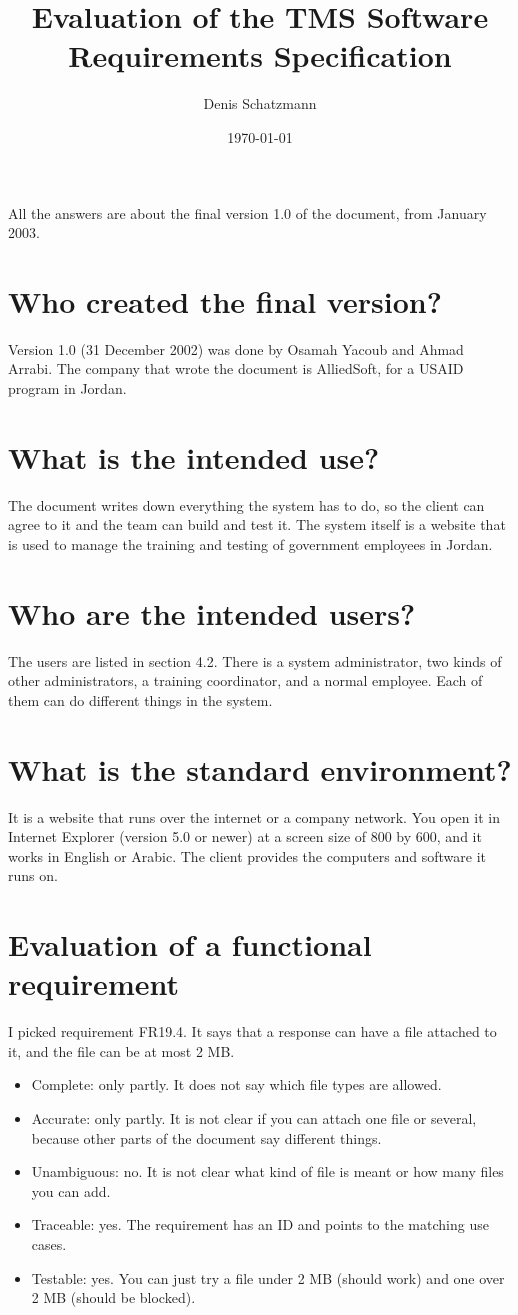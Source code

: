 \documentclass[11pt]{article}
\title{Evaluation of the TMS Software Requirements Specification}
\author{Denis Schatzmann}
\date{\today}
\begin{document}
\maketitle

All the answers are about the final version 1.0 of the document, from January 2003.

\section{Who created the final version?}
Version 1.0 (31 December 2002) was done by Osamah Yacoub and Ahmad Arrabi. The
company that wrote the document is AlliedSoft, for a USAID program in Jordan.

\section{What is the intended use?}
The document writes down everything the system has to do, so the client can
agree to it and the team can build and test it. The system itself is a website
that is used to manage the training and testing of government employees in
Jordan.

\section{Who are the intended users?}
The users are listed in section 4.2. There is a system administrator, two kinds
of other administrators, a training coordinator, and a normal employee. Each of
them can do different things in the system.

\section{What is the standard environment?}
It is a website that runs over the internet or a company network. You open it in
Internet Explorer (version 5.0 or newer) at a screen size of 800 by 600, and it
works in English or Arabic. The client provides the computers and software it
runs on.

\section{Evaluation of a functional requirement}
I picked requirement FR19.4. It says that a response can have a file attached to
it, and the file can be at most 2 MB.
\begin{itemize}
  \item Complete: only partly. It does not say which file types are allowed.
  \item Accurate: only partly. It is not clear if you can attach one file or
        several, because other parts of the document say different things.
  \item Unambiguous: no. It is not clear what kind of file is meant or how many
        files you can add.
  \item Traceable: yes. The requirement has an ID and points to the matching use
        cases.
  \item Testable: yes. You can just try a file under 2 MB (should work) and one
        over 2 MB (should be blocked).
\end{itemize}
\end{document}
